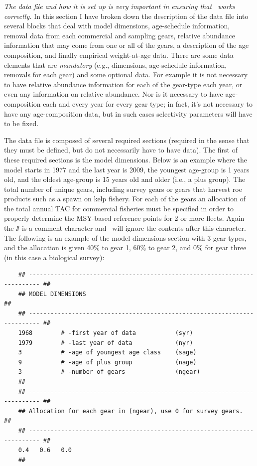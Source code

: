 \begin{multicols}{2}
\emph{The data file and how it is set up is very important in ensuring that \iscam\ works correctly.}  In this section I have broken down the description of the data file into several blocks that deal with model dimensions, age-schedule information, removal data from each commercial and sampling gears, relative abundance information that may come from one or all of the gears,  a description of the age composition, and finally empirical weight-at-age data.  There are some data elements that are \emph{mandatory} (e.g., dimensions, age-schedule information, removals for each gear) and some optional data.  For example it is not necessary to have relative abundance information for each of the gear-type each year, or even any information on relative abundance.  Nor is it necessary to have age-composition each and every year for every gear type; in fact, it's not necessary to have any age-composition data, but in such cases selectivity parameters will have to be fixed.


The data file is composed of several required sections (required in the sense that they must be defined, but do not necessarily have to have data).  The first of these required sections is the model dimensions.  Below is an example where the model starts in 1977 and the last year is 2009, the youngest age-group is 1 years old, and the oldest age-group is 15 years old and older (i.e., a plus group).  The total number of unique gears, including survey gears or gears that harvest roe products such as a spawn on kelp fishery.  For each of the gears an allocation of the total annual TAC for commercial fisheries must be specified in order to properly determine the MSY-based reference points for 2 or more fleets.  Again the \verb"#" is a comment character and \iscam\ will ignore the contents after this character.  The following is an example of the model dimensions section with 3 gear types, and the allocation is given 40\% to gear 1, 60\% to gear 2, and 0\% for gear three (in this case a biological survey):
\end{multicols}
\begin{verbatim}
    ## ------------------------------------------------------------------------- ##
    ## MODEL DIMENSIONS                                                          ##
    ## ------------------------------------------------------------------------- ##
    1968        # -first year of data           (syr)
    1979        # -last year of data            (nyr)
    3           # -age of youngest age class    (sage)
    9           # -age of plus group            (nage)
    3           # -number of gears              (ngear)
    ##
    ## ------------------------------------------------------------------------- ##
    ## Allocation for each gear in (ngear), use 0 for survey gears.              ##
    ## ------------------------------------------------------------------------- ##
    0.4   0.6   0.0
    ##
\end{verbatim}
